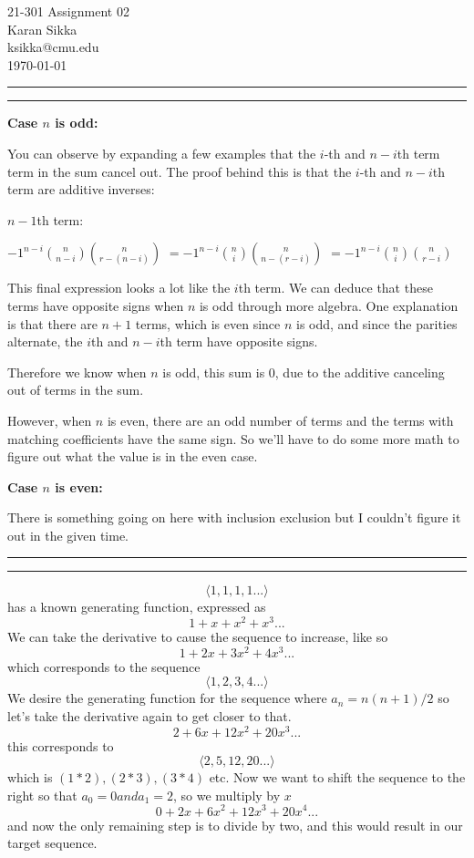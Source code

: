 \documentclass[11pt,letterpaper]{article}
\makeatletter
\newcommand{\question}[2] {\vspace{.25in} \hrule\vspace{0.5em}
\noindent{\bf #1: #2} \vspace{0.5em}
\hrule \vspace{.10in}}
\newcommand{\myname}{Karan Sikka}
\newcommand{\myandrew}{ksikka@cmu.edu}
\newcommand{\myhwnum}{02}
\makeatother
\begin{document}
\medskip

\thispagestyle{plain}
\begin{center}                  %
{\Large 21-301 Assignment \myhwnum} \\
\myname \\
\myandrew \\
\today
\end{center}


\question{1}{1}
\textbf{Case $n$ is odd:}

You can observe by expanding a few examples that the $i$-th and $n-i$th term term in the sum cancel out.
The proof behind this is that the $i$-th and $n-i$th term are additive inverses:

$n-1$th term:

$ -1^{n-i} { n \choose n - i } { n \choose r - (n-i) }$
$=  -1^{n-i} { n \choose i } { n \choose n - (r-i) }$
$=  -1^{n-i} { n \choose i } { n \choose r - i }$

This final expression looks a lot like the $i$th term. We can deduce that these terms have opposite signs when $n$ is odd through more algebra.
One explanation is that there are $n + 1$ terms, which is even since $n$ is odd, and since the parities alternate, the $i$th and $n-i$th term have opposite signs.

Therefore we know when $n$ is odd, this sum is 0, due to the additive canceling out of terms in the sum.


However, when $n$ is even, there are an odd number of terms and the terms with matching coefficients have the same sign. So we'll have to do some more math to figure out what the value is in the even case.

\textbf{Case $n$ is even:}

There is something going on here with inclusion exclusion but I couldn't figure it out in the given time.




\question{2}{2}
$$\langle 1, 1, 1, 1 ... \rangle$$
has a known generating function, expressed as
$$ 1 + x + x^2 + x^3 ... $$
We can take the derivative to cause the sequence to increase, like so
$$ 1 + 2x + 3x^2 + 4x^3 ... $$
which corresponds to the sequence
$$\langle 1, 2, 3, 4 ... \rangle$$
We desire the generating function for the sequence where $a_n = n(n+1)/2$ so let's take the derivative again to get closer to that.
$$ 2 + 6x + 12x^2 + 20x^3 ... $$
this corresponds to
$$\langle 2, 5, 12, 20 ... \rangle$$
which is $(1*2), (2*3), (3*4)$ etc. Now we want to shift the sequence to the right so that $a_0 = 0 and a_1 = 2$, so we multiply by $x$
$$ 0 + 2x + 6x^2 + 12x^3 + 20x^4 ... $$
and now the only remaining step is to divide by two, and this would result in our target sequence.
\end{document}
